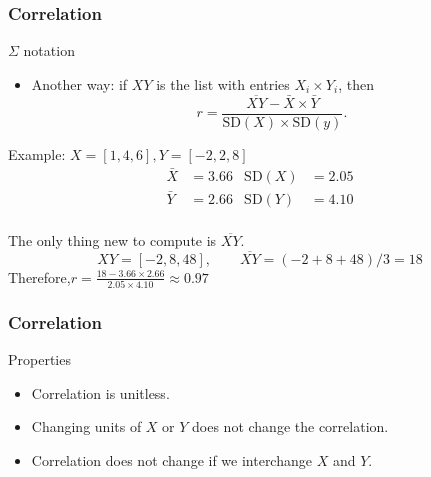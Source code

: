\documentclass[handout]{beamer}
\begin{document}
   \begin{frame} \frametitle{Correlation}

   \begin{block}
   {$\Sigma$ notation}

   \begin{itemize}
   \item Another way: if $XY$ is the list with entries $X_i \times Y_i$, then
   $$
   r = \frac{\overline{XY} - \bar{X} \times \bar{Y}}{\text{SD}(X) \times \text{SD}(y)}.
   $$
   \end{itemize}

   \end{block}

   \begin{block}
   {Example: $X=[1,4,6], Y=[-2,2,8]$}
   $$
   \begin{aligned}
   \bar{X} &= 3.66 & \text{SD}(X) &= 2.05 \\
   \bar{Y} &= 2.66 & \text{SD}(Y) &= 4.10 \\
   \end{aligned}
   $$

   The only thing new to compute is $\overline{XY}$.
   $$
   XY = [-2,8,48], \qquad \overline{XY}=(-2+8+48)/3=18
   $$
   Therefore,$ r = \frac{18 - 3.66 \times 2.66}{2.05 \times 4.10} \approx 0.97$

   \end{block}
   \end{frame}


   \begin{frame} \frametitle{Correlation}

   \begin{block}
   {Properties}

   \begin{itemize}
   \item Correlation is unitless.

   \item Changing units of $X$ or $Y$ does not change the correlation.

   \item Correlation does not change if we interchange $X$ and $Y$.

   \end{itemize}

   \end{block}
   \end{frame}
\end{document}
